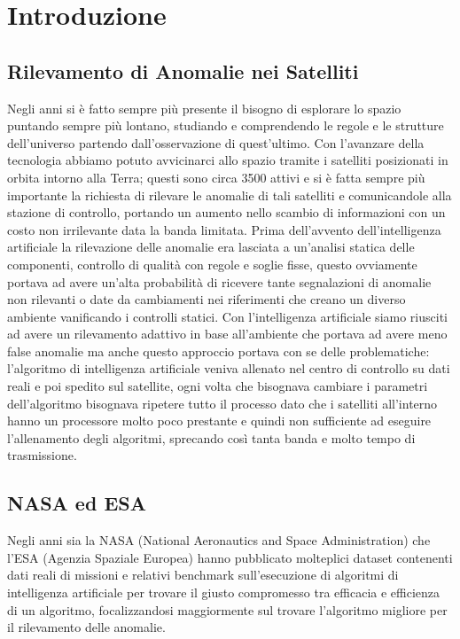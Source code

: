 \chapter{Introduzione}
\section{Rilevamento di Anomalie nei Satelliti}
Negli anni si è fatto sempre più presente il bisogno di esplorare lo spazio puntando sempre più lontano, studiando e comprendendo le regole e le strutture dell'universo partendo dall'osservazione di quest'ultimo. Con l'avanzare della tecnologia abbiamo potuto avvicinarci allo spazio tramite i satelliti posizionati in orbita intorno alla Terra; questi sono circa 3500 attivi e si è fatta sempre più importante la richiesta di rilevare le anomalie di tali satelliti e comunicandole alla stazione di controllo, portando un aumento nello scambio di informazioni con un costo non irrilevante data la banda limitata.
Prima dell'avvento dell'intelligenza artificiale la rilevazione delle anomalie era lasciata a un'analisi statica delle componenti, controllo di qualità con regole e soglie fisse, questo ovviamente portava ad avere un'alta probabilità di ricevere tante segnalazioni di anomalie non rilevanti o date da cambiamenti nei riferimenti che creano un diverso ambiente vanificando i controlli statici.
Con l'intelligenza artificiale siamo riusciti ad avere un rilevamento adattivo in base all'ambiente che portava ad avere meno false anomalie ma anche questo approccio portava con se delle problematiche: l'algoritmo di intelligenza artificiale veniva allenato nel centro di controllo su dati reali e poi spedito sul satellite, ogni volta che bisognava cambiare i parametri dell'algoritmo bisognava ripetere tutto il processo dato che i satelliti all'interno hanno un processore molto poco prestante e quindi non sufficiente ad eseguire l'allenamento degli algoritmi, sprecando così tanta banda e molto tempo di trasmissione.

\section{NASA ed ESA}
Negli anni sia la NASA (National Aeronautics and Space Administration) che l'ESA (Agenzia Spaziale Europea) hanno pubblicato molteplici dataset contenenti dati reali di missioni e relativi benchmark sull'esecuzione di algoritmi di intelligenza artificiale per trovare il giusto compromesso tra efficacia e efficienza di un algoritmo, focalizzandosi maggiormente sul trovare l'algoritmo migliore per il rilevamento delle anomalie.

